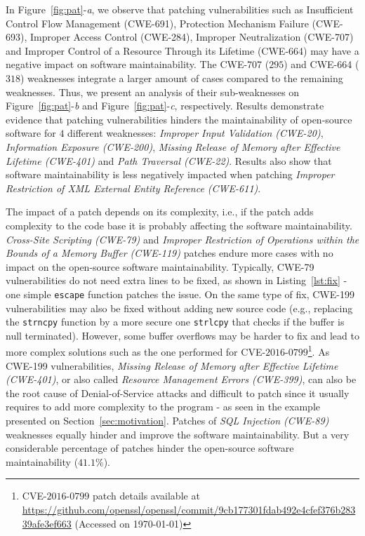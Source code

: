 \documentclass[10pt,conference]{IEEEtran}
\begin{document}
In Figure~\ref{fig:pat}-\emph{a}, we observe that patching vulnerabilities
such as Insufficient Control Flow Management 
(CWE-691), Protection Mechanism Failure (CWE-693), Improper Access Control 
(CWE-284), Improper Neutralization (CWE-707) and Improper Control of a Resource 
Through its Lifetime (CWE-664) may have a negative impact on software 
maintainability. The CWE-707 ($295$) and CWE-664 ($318$) 
weaknesses integrate a larger amount of cases compared to the remaining 
weaknesses. Thus, we present an analysis of their sub-weaknesses on 
Figure~\ref{fig:pat}-\emph{b} and Figure~\ref{fig:pat}-\emph{c}, respectively. 
Results demonstrate evidence that patching vulnerabilities hinders 
the maintainability of open-source software for $4$ different weaknesses: 
\emph{Improper Input Validation (CWE-20)}, \emph{Information Exposure 
(CWE-200)}, \emph{Missing Release of Memory after Effective 
Lifetime (CWE-401)} and \emph{Path Traversal (CWE-22)}. Results also show that 
software maintainability is less negatively impacted when patching 
\emph{Improper Restriction of XML External Entity Reference (CWE-611)}.  

The impact of a patch depends on its complexity, i.e., if the patch
adds complexity to the code base it is probably affecting the software
maintainability. \emph{Cross-Site Scripting (CWE-79)} and 
\emph{Improper Restriction of Operations within the Bounds of 
a Memory Buffer (CWE-119)} patches endure more
cases with no impact on the open-source software maintainability.
Typically, CWE-79 vulnerabilities do not need extra lines 
to be fixed, as shown in Listing~\ref{lst:fix} - one simple 
\texttt{escape} function patches the issue. On the same type of fix,
CWE-199 vulnerabilities may also be fixed without adding new source code
(e.g., replacing the \texttt{strncpy} function by a more secure one 
\texttt{strlcpy} that checks if the buffer is null terminated). However,
some buffer overflows may be harder to fix and lead to more complex 
solutions such as the one performed for 
CVE-$2016$-$0799$\footnote{CVE-$2016$-$0799$ patch details available at 
\url{https://github.com/openssl/openssl/commit/9cb177301fdab492e4cfef376b28339afe3ef663} (Accessed on \today{})}.
As CWE-199 
vulnerabilities, \emph{Missing Release of Memory after Effective 
Lifetime (CWE-401)}, or also called \emph{Resource Management Errors (CWE-399)}, can also be the root cause of Denial-of-Service attacks and  
difficult to patch since it usually requires to add more complexity to the program 
- as seen in the example presented on Section~\ref{sec:motivation}. 
Patches of \emph{SQL Injection
(CWE-89)} weaknesses equally hinder and improve the software maintainability. 
But a very considerable percentage of patches hinder the open-source 
software maintainability ($41.1\%$). 
\end{document}
